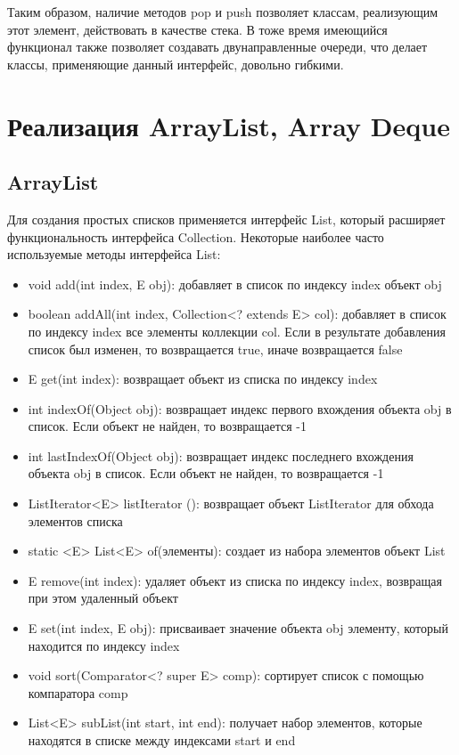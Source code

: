 Таким образом, наличие методов pop и push позволяет классам, реализующим этот элемент, действовать в качестве стека. В тоже время имеющийся функционал также позволяет создавать двунаправленные очереди, что делает классы, применяющие данный интерфейс, довольно гибкими.

\section{Реализация ArrayList, Array Deque}
\subsection{ArrayList}
Для создания простых списков применяется интерфейс List, который расширяет функциональность интерфейса Collection. Некоторые наиболее часто используемые методы интерфейса List:

\begin{itemize}
\item void add(int index, E obj): добавляет в список по индексу index объект obj
\item boolean addAll(int index, Collection<? extends E> col): добавляет в список по индексу index все элементы коллекции col. Если в результате добавления список был изменен, то возвращается true, иначе возвращается false
\item E get(int index): возвращает объект из списка по индексу index
\item int indexOf(Object obj): возвращает индекс первого вхождения объекта obj в список. Если объект не найден, то возвращается -1
\item int lastIndexOf(Object obj): возвращает индекс последнего вхождения объекта obj в список. Если объект не найден, то возвращается -1
\item ListIterator<E> listIterator (): возвращает объект ListIterator для обхода элементов списка
\item static <E> List<E> of(элементы): создает из набора элементов объект List
\item E remove(int index): удаляет объект из списка по индексу index, возвращая при этом удаленный объект
\item E set(int index, E obj): присваивает значение объекта obj элементу, который находится по индексу index
\item void sort(Comparator<? super E> comp): сортирует список с помощью компаратора comp
\item List<E> subList(int start, int end): получает набор элементов, которые находятся в списке между индексами start и end
\end{itemize}

